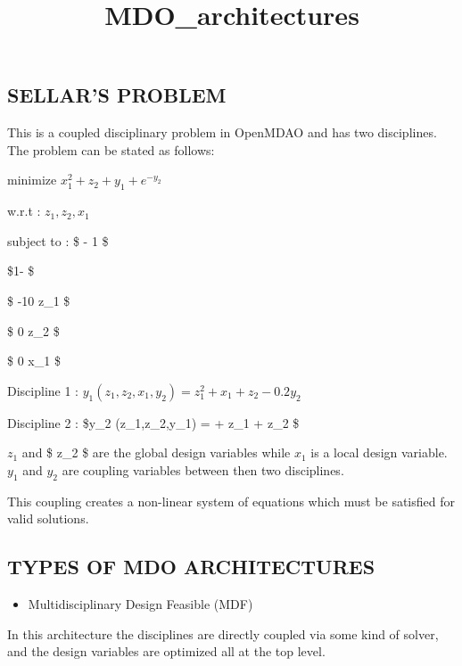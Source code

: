 \documentclass[11pt]{article}
\title{MDO\_architectures}
\providecommand{\tightlist}{%
      \setlength{\itemsep}{0pt}\setlength{\parskip}{0pt}}
\begin{document}
    
    
    \maketitle
    
    

    
    \subsection{SELLAR'S PROBLEM}\label{sellars-problem}

This is a coupled disciplinary problem in OpenMDAO and has two
disciplines. The problem can be stated as follows:

minimize \(x_1^2 +z_2 + y_1 + e^{-y_2}\)

w.r.t : \(z_1 , z_2 , x_1\)

subject to : \$ - 1  \$

\$1-  \$

\$ -10 \leq z\_1  \$

\$ 0 \leq z\_2  \$

\$ 0 \leq x\_1  \$

Discipline 1 : \(y_1 (z_1,z_2,x_1,y_2) = z_1 ^2 + x_1 + z_2 - 0.2y_2\)

Discipline 2 : \$y\_2 (z\_1,z\_2,y\_1) =  + z\_1 + z\_2 \$

\(z_1\) and \$ z\_2 \$ are the global design variables while \(x_1\) is
a local design variable. \(y_1\) and \(y_2\) are coupling variables
between then two disciplines.

This coupling creates a non-linear system of equations which must be
satisfied for valid solutions.

\subsection{TYPES OF MDO
ARCHITECTURES}\label{types-of-mdo-architectures}

\begin{itemize}
\tightlist
\item
  Multidisciplinary Design Feasible (MDF)
\end{itemize}

In this architecture the disciplines are directly coupled via some kind
of solver, and the design variables are optimized all at the top level. 
\end{document}
